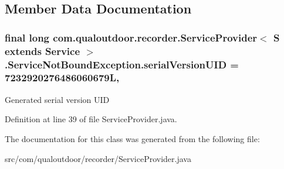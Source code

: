 \subsection{Member Data Documentation}
\hypertarget{classcom_1_1qualoutdoor_1_1recorder_1_1ServiceProvider_3_01S_01extends_01Service_01_4_1_1ServiceNotBoundException_ad767586e42cb0f84138992c17c9f504b}{
\subsubsection[{serial\-Version\-U\-I\-D}]{\setlength{\rightskip}{0pt plus 5cm}final long com.\-qualoutdoor.\-recorder.\-Service\-Provider$<$ S extends Service $>$.Service\-Not\-Bound\-Exception.\-serial\-Version\-U\-I\-D = 7232920276486060679\-L\hspace{0.3cm}{\ttfamily [static]}, {\ttfamily [private]}}}\label{classcom_1_1qualoutdoor_1_1recorder_1_1ServiceProvider_3_01S_01extends_01Service_01_4_1_1ServiceNotBoundException_ad767586e42cb0f84138992c17c9f504b}
Generated serial version U\-I\-D 

Definition at line 39 of file Service\-Provider.\-java.



The documentation for this class was generated from the following file\-:\begin{DoxyCompactItemize}
\item 
src/com/qualoutdoor/recorder/Service\-Provider.\-java\end{DoxyCompactItemize}
